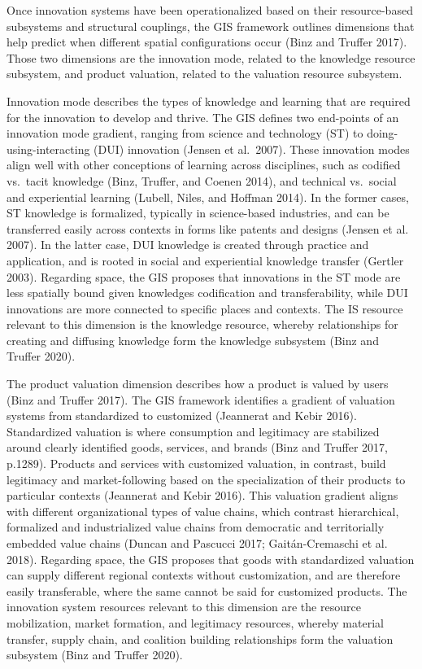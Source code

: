 \documentclass[twoside,12pt,final]{ucthesis-CA2012}
\begin{document}
\begin{ucmainmatter}
Once innovation systems have been operationalized based on their
resource-based subsystems and structural couplings, the GIS framework
outlines dimensions that help predict when different spatial
configurations occur (Binz and Truffer
2017). Those two dimensions
are the innovation mode, related to the knowledge resource subsystem,
and product valuation, related to the valuation resource subsystem.

Innovation mode describes the types of knowledge and learning that are
required for the innovation to develop and thrive. The GIS defines two
end-points of an innovation mode gradient, ranging from \textquotesingle science and
technology\textquotesingle{} (ST) to \textquotesingle doing-using-interacting\textquotesingle{} (DUI) innovation
(Jensen et al.~2007).
These innovation modes align well with other conceptions of learning
across disciplines, such as codified vs.~tacit knowledge (Binz,
Truffer, and Coenen 2014),
and technical vs.~social and experiential learning (Lubell, Niles, and
Hoffman 2014). In the
former cases, ST knowledge is formalized, typically in science-based
industries, and can be transferred easily across contexts in forms like
patents and designs (Jensen et al.
2007). In the latter case,
DUI knowledge is created through practice and application, and is rooted
in social and experiential knowledge transfer (Gertler
2003). Regarding space, the
GIS proposes that innovations in the ST mode are less spatially bound
given knowledge\textquotesingle s codification and transferability, while DUI
innovations are more connected to specific places and contexts. The IS
resource relevant to this dimension is the knowledge resource, whereby
relationships for creating and diffusing knowledge form the knowledge
subsystem (Binz and Truffer
2020).

The product valuation dimension describes how a product is valued by
users (Binz and Truffer
2017). The GIS framework
identifies a gradient of valuation systems from standardized to
customized (Jeannerat and Kebir
2016). Standardized
valuation is where \textquotesingle consumption and legitimacy are stabilized around
clearly identified goods, services, and brands\textquotesingle{} (Binz and Truffer 2017,
p.1289). Products and services with customized valuation, in contrast,
build legitimacy and market-following based on the specialization of
their products to particular contexts (Jeannerat and Kebir
2016). This valuation
gradient aligns with different organizational types of value chains,
which contrast hierarchical, formalized and industrialized value chains
from democratic and territorially embedded value chains (Duncan and
Pascucci 2017; Gaitán-Cremaschi et al.
2018). Regarding space, the
GIS proposes that goods with standardized valuation can supply different
regional contexts without customization, and are therefore easily
transferable, where the same cannot be said for customized products. The
innovation system resources relevant to this dimension are the resource
mobilization, market formation, and legitimacy resources, whereby
material transfer, supply chain, and coalition building relationships
form the \textquotesingle valuation subsystem\textquotesingle{} (Binz and Truffer
2020).


\end{ucmainmatter}
\end{document}
